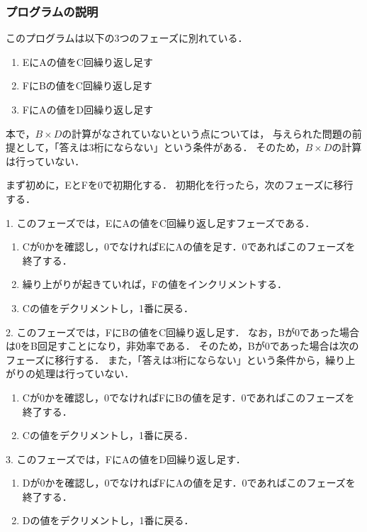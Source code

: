 \documentclass[dvipdfmx]{jsarticle}
\begin{document}
\subsubsection{プログラムの説明}
このプログラムは以下の3つのフェーズに別れている．
\begin{enumerate}
    \item EにAの値をC回繰り返し足す
    \item FにBの値をC回繰り返し足す
    \item FにAの値をD回繰り返し足す
\end{enumerate}
本で，$B\times D$の計算がなされていないという点については，
与えられた問題の前提として，「答えは3桁にならない」という条件がある．
そのため，$B\times D$の計算は行っていない．

まず初めに，EとFを0で初期化する．
初期化を行ったら，次のフェーズに移行する．

1. このフェーズでは，EにAの値をC回繰り返し足すフェーズである．
\begin{enumerate}
    \item Cが0かを確認し，0でなければEにAの値を足す．0であればこのフェーズを終了する．
    \item 繰り上がりが起きていれば，Fの値をインクリメントする．
    \item Cの値をデクリメントし，1番に戻る．
\end{enumerate}

2. このフェーズでは，FにBの値をC回繰り返し足す．
なお，Bが0であった場合は0をB回足すことになり，非効率である．
そのため，Bが0であった場合は次のフェーズに移行する．
また，「答えは3桁にならない」という条件から，繰り上がりの処理は行っていない．
\begin{enumerate}
    \item Cが0かを確認し，0でなければFにBの値を足す．0であればこのフェーズを終了する．
    \item Cの値をデクリメントし，1番に戻る．
\end{enumerate}

3. このフェーズでは，FにAの値をD回繰り返し足す．
\begin{enumerate}
    \item Dが0かを確認し，0でなければFにAの値を足す．0であればこのフェーズを終了する．
    \item Dの値をデクリメントし，1番に戻る．
\end{enumerate}
\end{document}
